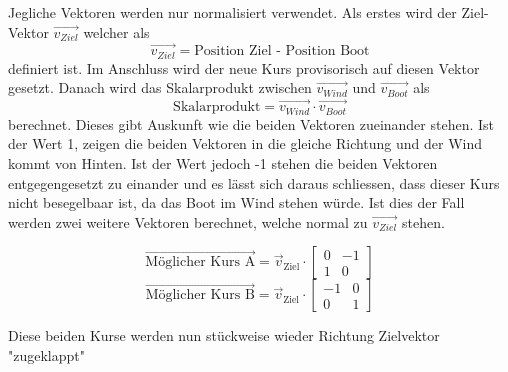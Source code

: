 Jegliche Vektoren werden nur normalisiert verwendet. Als erstes wird der Ziel-Vektor $\Vec{v_{Ziel}}$ welcher als $$\Vec{v_{Ziel}} = \text{Position Ziel - Position Boot}$$ definiert ist. Im Anschluss wird der neue Kurs provisorisch auf diesen Vektor gesetzt.
Danach wird das Skalarprodukt zwischen $\Vec{v_{Wind}}$ und $\Vec{v_{Boot}}$ als $$\text{Skalarprodukt} = \Vec{v_{Wind}} \cdot \Vec{v_{Boot}}$$ berechnet. Dieses gibt Auskunft wie die beiden Vektoren zueinander stehen. Ist der Wert 1, zeigen die beiden Vektoren in die gleiche Richtung und der Wind kommt von Hinten. Ist der Wert jedoch -1 stehen die beiden Vektoren entgegengesetzt zu einander und es lässt sich daraus schliessen, dass dieser Kurs nicht besegelbaar ist, da das Boot im Wind stehen würde. Ist dies der Fall werden zwei weitere Vektoren berechnet, welche normal zu $\Vec{v_{Ziel}}$ stehen. 

$$\vec{\text{Möglicher Kurs A}} = \vec{v}_{\text{Ziel}}  \cdot \begin{bmatrix}0 & -1 \\ 1 & 0\end{bmatrix} $$
$$\vec{\text{Möglicher Kurs B}} = \vec{v}_{\text{Ziel}} \cdot \begin{bmatrix}-1 & 0 \\ 0 & 1\end{bmatrix} $$

Diese beiden Kurse werden nun stückweise wieder Richtung Zielvektor "zugeklappt" 

